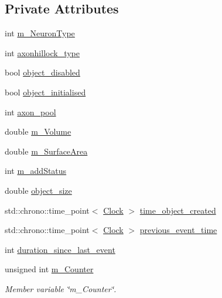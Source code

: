 \subsection*{Private Attributes}
\begin{DoxyCompactItemize}
\item 
int \mbox{\hyperlink{classAxonHillock_a1b3e5f60e24589baa3937c25d0fdaccb}{m\+\_\+\+Neuron\+Type}}
\item 
int \mbox{\hyperlink{classAxonHillock_abcf4792c5f64683a2ba6b3ad11b36c3b}{axonhillock\+\_\+type}}
\item 
bool \mbox{\hyperlink{classAxonHillock_aceaf38b22f77d3377d96e79d44b6c3d6}{object\+\_\+disabled}}
\item 
bool \mbox{\hyperlink{classAxonHillock_ac666d677d62505d33b1316f5688f1529}{object\+\_\+initialised}}
\item 
int \mbox{\hyperlink{classAxonHillock_a5128d2562b42d29b7bfc1492bfce7066}{axon\+\_\+pool}}
\item 
double \mbox{\hyperlink{classAxonHillock_ab475b735c12d372dc9227e84f8a5fe89}{m\+\_\+\+Volume}}
\item 
double \mbox{\hyperlink{classAxonHillock_ae8b94f0128e95735b088e2ed68bc1884}{m\+\_\+\+Surface\+Area}}
\item 
int \mbox{\hyperlink{classAxonHillock_a92b376c3bc0bf8f8a52f52e424f7a335}{m\+\_\+add\+Status}}
\item 
double \mbox{\hyperlink{classAxonHillock_a2b87848d4ae4bb3011347cb11656ee09}{object\+\_\+size}}
\item 
std\+::chrono\+::time\+\_\+point$<$ \mbox{\hyperlink{universe_8h_a0ef8d951d1ca5ab3cfaf7ab4c7a6fd80}{Clock}} $>$ \mbox{\hyperlink{classAxonHillock_ab8fe082b0aa59b58f6cf8ddb00202ae1}{time\+\_\+object\+\_\+created}}
\item 
std\+::chrono\+::time\+\_\+point$<$ \mbox{\hyperlink{universe_8h_a0ef8d951d1ca5ab3cfaf7ab4c7a6fd80}{Clock}} $>$ \mbox{\hyperlink{classAxonHillock_a569d0a3da91ca87f6e88a8cdb0949e81}{previous\+\_\+event\+\_\+time}}
\item 
int \mbox{\hyperlink{classAxonHillock_a5b03b9c1c492e6c37b808d0756fce018}{duration\+\_\+since\+\_\+last\+\_\+event}}
\item 
unsigned int \mbox{\hyperlink{classAxonHillock_a4ce4c0d7438dfb7a77f6412460e1adcc}{m\+\_\+\+Counter}}
\begin{DoxyCompactList}\small\item\em Member variable \char`\"{}m\+\_\+\+Counter\char`\"{}. \end{DoxyCompactList}\item 

\end{DoxyCompactItemize}
